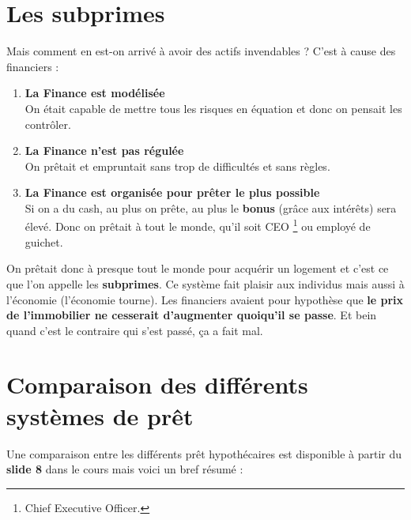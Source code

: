 \section{Les subprimes}
Mais comment en est-on arrivé à avoir des actifs invendables ? C'est à cause des financiers : 

\begin{enumerate}
\item \textbf{La Finance est modélisée}\\
On était capable de mettre tous les risques en équation et donc on pensait les contrôler. 

\item \textbf{La Finance n'est pas régulée}\\
On prêtait et empruntait sans trop de difficultés et sans règles.

\item \textbf{La Finance est organisée pour prêter le plus possible}\\
Si on a du cash, au plus on prête, au plus le \textbf{bonus} (grâce aux intérêts) sera élevé. Donc on prêtait à tout le monde, qu'il soit CEO \footnote{Chief Executive Officer.} ou employé de guichet.
\end{enumerate}
 
On prêtait donc à presque tout le monde pour acquérir un logement et c'est ce que l'on appelle les \textbf{subprimes}. Ce système fait plaisir aux individus mais aussi à l'économie (l'économie tourne). Les financiers avaient pour hypothèse que \textbf{le prix de l'immobilier ne cesserait d'augmenter quoiqu'il se passe}. Et bein quand c'est le contraire qui s'est passé, ça a fait mal.

\section{Comparaison des différents systèmes de prêt}
Une comparaison entre les différents prêt hypothécaires est disponible à partir du \textbf{slide 8} dans le cours mais voici un bref résumé :

